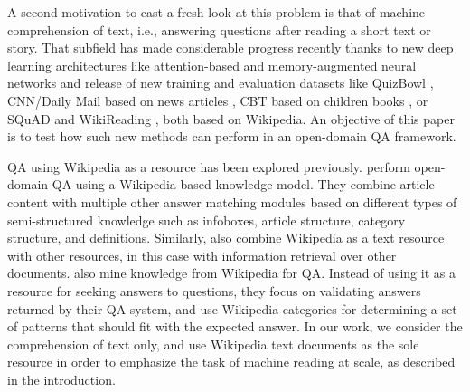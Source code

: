 \documentclass[11pt,a4paper]{article}
\begin{document}
A second motivation to cast a fresh look at this problem is that of machine comprehension of text, i.e., answering questions after reading a short text or story. That subfield has made considerable progress recently
thanks to new deep learning architectures like attention-based and memory-augmented neural networks \cite{bahdanau2015neural,weston2015memory,graves2014neural} and release of new training and evaluation datasets like QuizBowl \cite{iyyer2014neural}, CNN/Daily Mail based on news articles \cite{nips2015hermann}, CBT based on children books \cite{hill2015goldilocks}, or SQuAD \cite{rajpurkar2016squad} and WikiReading \cite{hewlett2016wiki}, both based on Wikipedia.
%
An objective of this paper is to test how such new methods can perform in an open-domain QA framework.


QA using Wikipedia as a resource has been explored previously.
\citet{ryu2014open} perform open-domain QA using a Wikipedia-based knowledge model. They combine article content with multiple other answer matching modules based on different types of semi-structured knowledge such as infoboxes, article structure, category structure, and definitions.
 Similarly, \citet{Ahn04} also combine Wikipedia as a text resource with other resources, in this case with information retrieval over other documents.
\citet{buscaldi2006mining} also mine knowledge from Wikipedia for QA. Instead of using it as a resource for seeking answers to questions, they focus on validating answers returned by their QA system, and use Wikipedia categories for determining a set of patterns that should fit with the expected answer.
In our work, we consider the comprehension of text only, and use Wikipedia text documents as the sole resource in order to emphasize the task of machine reading at scale, as described in the introduction.



\end{document}
